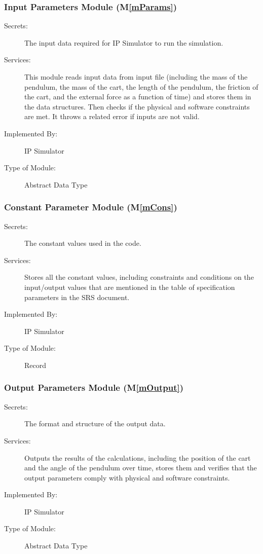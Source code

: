 \documentclass[12pt, titlepage]{article}
\newcommand{\mref}[1]{M\ref{#1}}
\begin{document}
\subsubsection{Input Parameters Module (\mref{mParams})}

\begin{description}
\item[Secrets:] The input data required for IP Simulator to run the simulation.

\item[Services:]This module reads input data from input file (including the mass of the pendulum, the mass of the cart, the length of the pendulum, the friction of the cart, and the external force as a function of time) and stores them in the data structures. Then checks if the physical and software constraints are met. It throws a related error if inputs are not valid.
\item[Implemented By:] IP Simulator
\item[Type of Module:] Abstract Data Type
\end{description}


\subsubsection{Constant Parameter Module (\mref{mCons})}
\begin{description}
\item[Secrets:] The constant values used in the code.
\item[Services:] Stores all the constant values, including constraints and conditions on the input/output values that are mentioned in the table of specification parameters in the SRS document.

\item[Implemented By:] IP Simulator
\item[Type of Module:] Record
\end{description} 
\subsubsection{Output Parameters Module (\mref{mOutput})}

\begin{description}
\item[Secrets:] The format and structure of the output data.
\item[Services:] Outputs the results of the calculations, including the position of the cart and the angle of the pendulum over time, stores them and verifies that the output parameters comply with physical and software constraints.
\item[Implemented By:] IP Simulator
\item[Type of Module:] Abstract Data Type
\end{description} 
\end{document}
